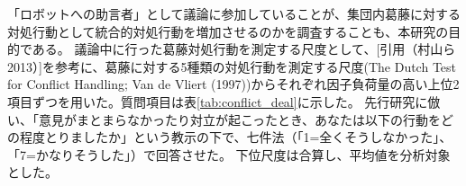 \documentclass[11pt, a4paper]{jreport} %
\begin{document}

「ロボットへの助言者」として議論に参加していることが、集団内葛藤に対する対処行動として統合的対処行動を増加させるのかを調査することも、本研究の目的である。
議論中に行った葛藤対処行動を測定する尺度として、[引用（村山ら2013）]を参考に、葛藤に対する5種類の対処行動を測定する尺度(The Dutch Test for Conflict Handling; Van de Vliert (1997))からそれぞれ因子負荷量の高い上位2項目ずつを用いた。質問項目は表\ref{tab:conflict_deal}に示した。
先行研究に倣い、「意見がまとまらなかったり対立が起こったとき、あなたは以下の行動をどの程度とりましたか」という教示の下で、七件法（「1=全くそうしなかった」、「7=かなりそうした」）で回答させた。
下位尺度は合算し、平均値を分析対象とした。
\end{document}
